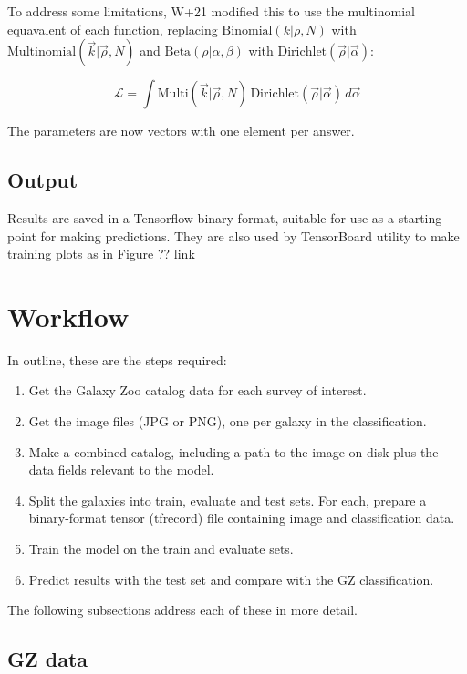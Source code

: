 \documentclass[preprint]{aastex631}
\newcommand{\todo}{\color{red}{TODO}\color{black}\hspace{2mm}}
\begin{document}
To address some limitations, W+21 modified this to use the multinomial equavalent of each function, replacing $\mathrm{Binomial} (k | \rho, N)$ with $\mathrm{Multinomial} (\vec{k} | \vec{\rho}, N)$ and $\mathrm{Beta} (\rho | \alpha, \beta)$ with $\mathrm{Dirichlet} (\vec{\rho} | \vec{\alpha})$:

\begin{equation}
 \mathcal{L} = \int \mathrm{Multi} (\vec{k} | \vec{\rho}, N)\, \mathrm{Dirichlet} (\vec{\rho} | \vec{\alpha})\, d\vec{\alpha} 
\end{equation}

The parameters are now vectors with one element per answer.

\subsection{Output}

Results are saved in a Tensorflow binary format, suitable for use as a starting point for making predictions. They are also used by TensorBoard utility to make training plots as in Figure ?? \todo link


\section{Workflow}

In outline, these are the steps required:

\begin{enumerate}
	\item Get the Galaxy Zoo catalog data for each survey of interest.
	\item Get the image files (JPG or PNG), one per galaxy in the classification.
	\item Make a combined catalog, including a path to the image on disk plus the data fields relevant to the model.
	\item Split the galaxies into train, evaluate and test sets. For each, prepare a binary-format tensor (tfrecord) file containing image and classification data.
	\item Train the model on the train and evaluate sets.
	\item Predict results with the test set and compare with the GZ classification.
\end{enumerate}

The following subsections address each of these in more detail.

\subsection{GZ data}
\end{document}
